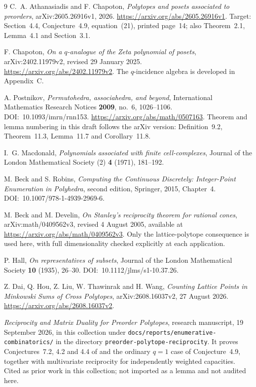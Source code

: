 \documentclass[11pt]{article}
\numberwithin{equation}{section}
\theoremstyle{definition}
\theoremstyle{remark}
\begin{document}
\begin{thebibliography}{9}
C.~A. Athanasiadis and F. Chapoton,
\emph{Polytopes and posets associated to preorders},
arXiv:2605.26916v1, 2026.
\url{https://arxiv.org/abs/2605.26916v1}.
Target: Section~4.4, Conjecture~4.9, equation~(21), printed page~14;
also Theorem~2.1, Lemma~4.1 and Section~3.1.

F. Chapoton,
\emph{On a $q$-analogue of the Zeta polynomial of posets},
arXiv:2402.11979v2, revised 29 January 2025.
\url{https://arxiv.org/abs/2402.11979v2}.
The $q$-incidence algebra is developed in Appendix~C.

A. Postnikov,
\emph{Permutohedra, associahedra, and beyond},
International Mathematics Research Notices \textbf{2009}, no.~6,
1026--1106. DOI:~10.1093/imrn/rnn153.
\url{https://arxiv.org/abs/math/0507163}.
Theorem and lemma numbering in this draft follows the arXiv version:
Definition~9.2, Theorem~11.3, Lemma~11.7 and Corollary~11.8.

I.~G. Macdonald,
\emph{Polynomials associated with finite cell-complexes},
Journal of the London Mathematical Society (2) \textbf{4} (1971), 181--192.

M. Beck and S. Robins,
\emph{Computing the Continuous Discretely: Integer-Point Enumeration in
Polyhedra}, second edition, Springer, 2015, Chapter~4.
DOI:~10.1007/978-1-4939-2969-6.

M. Beck and M. Develin,
\emph{On Stanley's reciprocity theorem for rational cones},
arXiv:\allowbreak math/\allowbreak 0409562v3, revised 4 August 2005,
available at \url{https://arxiv.org/abs/math/0409562v3}. Only the
lattice-polytope consequence is used here, with full dimensionality checked
explicitly at each application.

P. Hall,
\emph{On representatives of subsets},
Journal of the London Mathematical Society \textbf{10} (1935), 26--30.
DOI:~10.1112/jlms/s1-10.37.26.

Z. Dai, Q. Hou, Z. Liu, W. Thawinrak and H. Wang,
\emph{Counting Lattice Points in Minkowski Sums of Cross Polytopes},
arXiv:2608.16037v2, 27 August 2026.
\url{https://arxiv.org/abs/2608.16037v2}.

\emph{Reciprocity and Matrix Duality for Preorder Polytopes},
research manuscript, 19 September 2026, in this collection under
\nolinkurl{docs/reports/enumerative-combinatorics/} in the directory
\nolinkurl{preorder-polytope-reciprocity}. It proves Conjectures~7.2, 4.2
and 4.4 of \cite{AC} and the ordinary $q=1$ case of Conjecture~4.9, together
with multivariate reciprocity for independently weighted capacities. Cited as
prior work in this collection; not imported as a lemma and not audited here.


\end{thebibliography}
\end{document}
